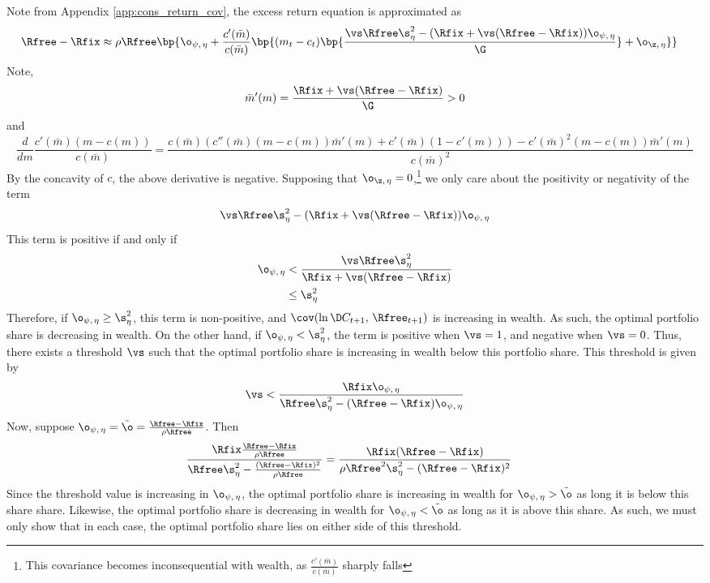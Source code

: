 

Note from Appendix \ref{app:cons_return_cov}, the excess return equation is approximated as
\begin{align*}
    \Rfree - \Rfix &\approx \rho\Rfree\bp{\o_{\psi,\,\eta} + \frac{c'(\bar{m})}{c(\bar{m})}\bp{(m_t - c_t)\bp{\frac{\vs\Rfree\s_{\eta}^2 - (\Rfix + \vs(\Rfree - \Rfix))\o_{\psi,\,\eta}}{\G}} + \o_{\z,\,\eta}}}
\end{align*}
Note,
\[
\bar{m}'(m) = \frac{\Rfix + \vs(\Rfree - \Rfix)}{\G} > 0
\]
and
\[
\frac{d}{dm}\frac{c'(\bar{m})(m - c(m))}{c(\bar{m})} = \frac{c(\bar{m})(c''(\bar{m})(m - c(m))\bar{m}'(m) + c'(\bar{m})(1 - c'(m))) - c'(\bar{m})^2(m - c(m))\bar{m}'(m)}{c(\bar{m})^2}
\]
By the concavity of $c$, the above derivative is negative. Supposing that $\o_{\z,\,\eta} = 0$,\footnote{This covariance becomes inconsequential with wealth, as $\frac{c'(\bar{m})}{c(\bar{m})}$ sharply falls} we only care about the positivity or negativity of the term
\[
    \vs\Rfree\s_{\eta}^2 - (\Rfix + \vs(\Rfree - \Rfix))\o_{\psi,\,\eta}
\]
This term is positive if and only if
\begin{align*}
    \o_{\psi,\,\eta} &< \frac{\vs\Rfree\s_{\eta}^2}{\Rfix + \vs(\Rfree - \Rfix)}\\
    &\leq \s_{\eta}^2
\end{align*}
Therefore, if $\o_{\psi,\,\eta} \geq \s_{\eta}^2$, this term is non-positive, and $\cov(\ln \D C_{t+1},\,\Rfree_{t+1})$ is increasing in wealth. As such, the optimal portfolio share is decreasing in wealth. On the other hand, if $\o_{\psi,\,\eta} < \s_{\eta}^2$, the term is positive when $\vs = 1$, and negative when $\vs = 0$. Thus, there exists a threshold $\vs$ such that the optimal portfolio share is increasing in wealth below this portfolio share. This threshold is given by
\[
\vs < \frac{\Rfix\o_{\psi,\,\eta}}{\Rfree\s_{\eta}^2 - (\Rfree - \Rfix)\o_{\psi,\,\eta}}
\]
Now, suppose $\o_{\psi,\,\eta} = \tilde{\o} = \frac{\Rfree - \Rfix}{\rho\Rfree}$. Then
\begin{align*}
    \frac{\Rfix\frac{\Rfree - \Rfix}{\rho\Rfree}}{\Rfree\s_{\eta}^2 - \frac{(\Rfree - \Rfix)^2}{\rho\Rfree}} &= \frac{\Rfix(\Rfree - \Rfix)}{\rho\Rfree^2\s_{\eta}^2 - (\Rfree - \Rfix)^2}
\end{align*}
Since the threshold value is increasing in $\o_{\psi,\,\eta}$, the optimal portfolio share is increasing in wealth for $\o_{\psi,\,\eta} > \tilde{\o}$ as long it is below this share share. Likewise, the optimal portfolio share is decreasing in wealth for $\o_{\psi,\,\eta} < \tilde{\o}$ as long as it is above this share. As such, we must only show that in each case, the optimal portfolio share lies on either side of this threshold.

